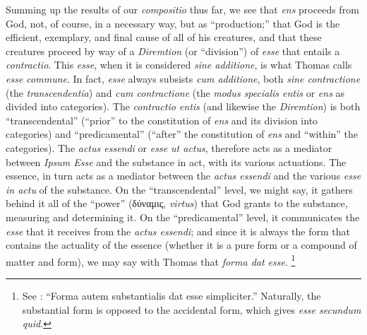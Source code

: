 Summing up the results of our \emph{compositio} thus far, we see that \emph{ens} proceeds from God, not, of course, in a necessary way, but as “production;” that God is the efficient, exemplary, and final cause of all of his creatures, and that these creatures proceed by way of a \emph{Diremtion} (or “division”) of \emph{esse} that entails a \emph{contractio}. This \emph{esse}, when it is considered \emph{sine additione}, is what Thomas calls \emph{esse commune}. In fact, \emph{esse} always subsists \emph{cum additione}, both \emph{sine contractione} (the \emph{transcendentia}) and \emph{cum contractione} (the \emph{modus specialis entis} or \emph{ens} as divided into categories). The \emph{contractio entis} (and likewise the \emph{Diremtion}) is both “transcendental” (“prior” to the constitution of \emph{ens} and its division into categories) and “predicamental” (“after” the constitution of \emph{ens} and “within” the categories). The \emph{actus essendi} or \emph{esse ut actus}, therefore acts as a mediator between \emph{Ipsum Esse} and the substance in act, with its various actuations. The essence, in turn acts as a mediator between the \emph{actus essendi} and the various \emph{esse in actu} of the substance. On the “transcendental” level, we might say, it gathers behind it all of the “power” (δύναμις, \emph{virtus}) that God grants to the substance, measuring and determining it. On the “predicamental” level, it communicates the \emph{esse} that it receives from the \emph{actus essendi}; and since it is always the form that contains the actuality of the essence (whether it is a pure form or a compound of matter and form), we may say with Thomas that \emph{forma dat esse}.%
%
\footnote{See \cite[I, q.~76, a.~4, co.]{st:summa}: “Forma autem substantialis dat esse simpliciter.” Naturally, the substantial form is opposed to the accidental form, which gives \emph{esse secundum quid}.}
%

